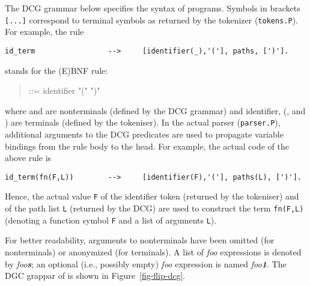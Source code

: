 The DCG grammar below specifies the syntax of \FLIP programs.  Symbols
in brackets \texttt{[...]} correspond to {terminal symbols} as
returned by the tokenizer (\texttt{tokens.P}). For example, the rule
\begin{verbatim}
id_term                 -->     [identifier(_),'('], paths, [')'].
\end{verbatim}
stands for the (E)BNF rule:
\begin{quote}
   ::= \textsf{identifier} "\textsf{(}"  "\textsf{)}"
\end{quote}
where  and  are nonterminals (defined by
the DCG grammar) and \textsf{identifier}, \textsf{(}, and \textsf{)}
are terminals (defined by the tokeniser). In the actual \FLIP parser
(\texttt{parser.P}), additional arguments to the DCG predicates are
used to propagate variable bindings from the rule body to the head.
For example, the actual code of the  above rule is
\begin{verbatim}
id_term(fn(F,L))        -->     [identifier(F),'('], paths(L), [')'].
\end{verbatim}
Hence, the actual value \texttt{F} of the identifier token (returned
by the tokeniser) and of the path list \texttt{L} (returned by the
DCG) are used to construct the term \texttt{fn(F,L)}
(denoting a function symbol \texttt{F} and a list of arguments
\texttt{L}). 

For better readability, arguments to nonterminals have been omitted
(for nonterminals) or anonymized (for terminals). A list of \emph{foo}
expressions is denoted by \emph{foo\textbf{s}}; an optional (i.e.,
possibly empty) \emph{foo} expression is named \emph{foo\textbf{1}}.
The DGC grappar of \FLIP is shown in Figure~\ref{fig-flip-dcg}.


